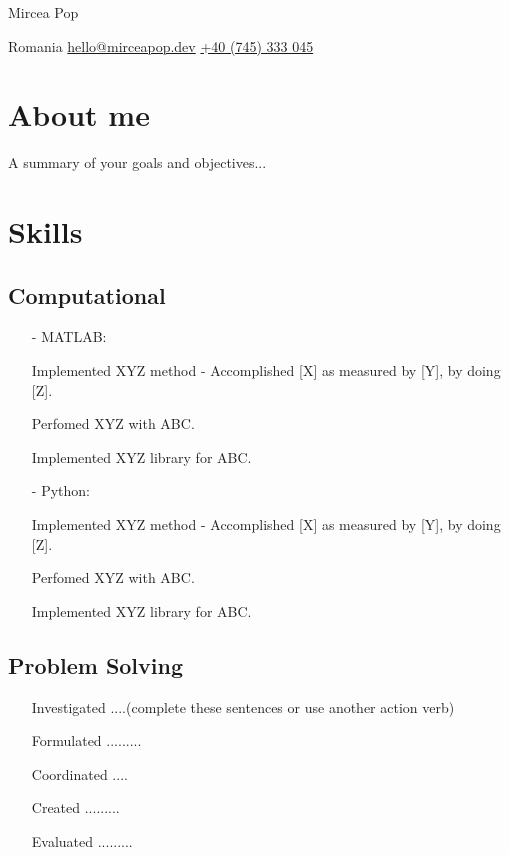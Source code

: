 \documentclass[11pt]{article}
\begin{document}
    
    \begin{center}      
        {\fontsize{28}{28}\selectfont Mircea Pop} \\ \bigskip
    
        {\color{icnclr}\faMapMarker} Romania \quad 
        {\color{icnclr}\faEnvelope[regular]} \href{mailto:hello@mirceapop.dev}{hello@mirceapop.dev} \quad
        {\color{icnclr}} \href{tel:+40745333045}{+40 (745) 333 045} 
    \end{center}

    \section{About me}
    A summary of your goals and objectives...
   
    \section{Skills}
    \subsection{Computational}
    \begin{itemize}
        \item[-] \textcolor{Sepia}{MATLAB}:
        \item[\checkmark] Implemented XYZ method - Accomplished [X] as measured by [Y], by doing [Z].  
        \item[\checkmark] Perfomed XYZ with ABC. 
        \item[\checkmark] Implemented XYZ library for ABC. 
        \item[-] \textcolor{Sepia}{Python}: 
        \item[\checkmark] Implemented XYZ method - Accomplished [X] as measured by [Y], by doing [Z].  
        \item[\checkmark] Perfomed XYZ with ABC. 
        \item[\checkmark] Implemented XYZ library for ABC.
    \end{itemize}
    \subsection{Problem Solving}
    \begin{itemize}
        \item[\checkmark] Investigated ....(complete these sentences or use another action verb)
        \item[\checkmark] Formulated .........
        \item[\checkmark] Coordinated ....
        \item[\checkmark] Created .........
        \item[\checkmark] Evaluated .........
    \end{itemize}
\end{document}
